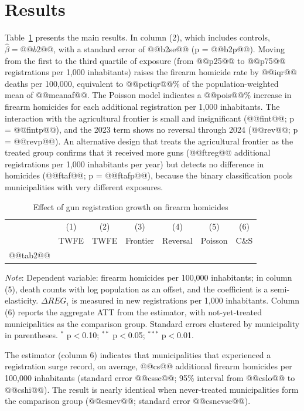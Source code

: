 \documentclass[11pt,a4paper]{article}
\newcommand{\nota}[1]{\par\vspace{2pt}\begin{minipage}{\linewidth}\footnotesize\textit{Note}: #1\end{minipage}}
\begin{document}
\section{Results}\label{sec:resultados}

Table~\ref{tab:main} presents the main results. In column (2), which includes controls, $\hat\beta = @@b2@@$, with a standard error of @@b2se@@ (p = @@b2p@@). Moving from the first to the third quartile of exposure (from @@p25@@ to @@p75@@ registrations per 1,000 inhabitants) raises the firearm homicide rate by @@iqr@@ deaths per 100,000, equivalent to @@pctiqr@@\% of the population-weighted mean of @@meanaf@@. The Poisson model indicates a @@pois@@\% increase in firearm homicides for each additional registration per 1,000 inhabitants. The interaction with the agricultural frontier is small and insignificant (@@fint@@; p = @@fintp@@), and the 2023 term shows no reversal through 2024 (@@rev@@; p = @@revp@@). An alternative design that treats the agricultural frontier as the treated group confirms that it received more guns (@@ftreg@@ additional registrations per 1,000 inhabitants per year) but detects no difference in homicides (@@ftaf@@; p = @@ftafp@@), because the binary classification pools municipalities with very different exposures.

\begin{table}[H]
\centering\footnotesize\setlength{\tabcolsep}{4pt}
\caption{Effect of gun registration growth on firearm homicides}\label{tab:main}
\begin{tabular}{lcccccc}
\toprule
 & (1) & (2) & (3) & (4) & (5) & (6) \\
 & TWFE & TWFE & Frontier & Reversal & Poisson & C\&S \\
\midrule
@@tab2@@
\bottomrule
\end{tabular}
\nota{Dependent variable: firearm homicides per 100,000 inhabitants; in column (5), death counts with log population as an offset, and the coefficient is a semi-elasticity. $\Delta REG_i$ is measured in new registrations per 1,000 inhabitants. Column (6) reports the aggregate ATT from the \citet{callaway2021} estimator, with not-yet-treated municipalities as the comparison group. Standard errors clustered by municipality in parentheses. $^{*}$ p$<$0.10; $^{**}$ p$<$0.05; $^{***}$ p$<$0.01.}
\end{table}

The \citet{callaway2021} estimator (column 6) indicates that municipalities that experienced a registration surge record, on average, @@cs@@ additional firearm homicides per 100,000 inhabitants (standard error @@csse@@; 95\% interval from @@cslo@@ to @@cshi@@). The result is nearly identical when never-treated municipalities form the comparison group (@@csnev@@; standard error @@csnevse@@).
\end{document}
